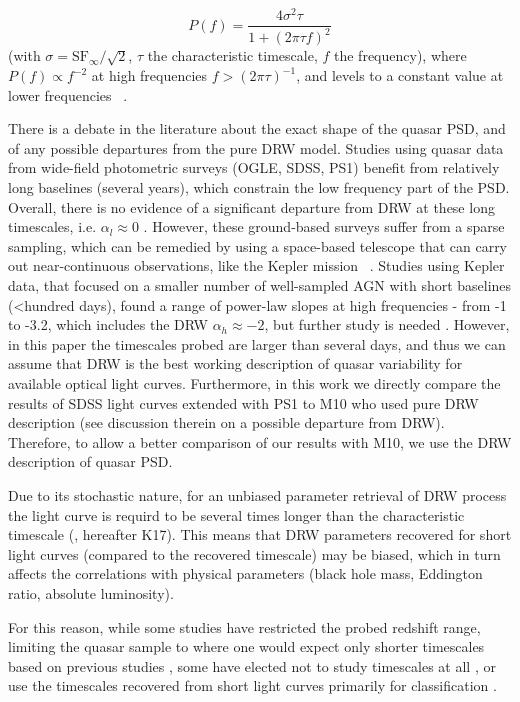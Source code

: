 \documentclass[twocolumn]{aastex62}
\begin{document}
\begin{equation}
P(f) = \frac{4\sigma^{2}\tau}{1+(2 \pi \tau f)^{2}}
\end{equation}
(with $\sigma = \mathrm{SF}_{\infty} / \sqrt{2}$, $\tau$ the characteristic timescale, $f$ the frequency), where $P(f) \propto f^{-2}$  at high frequencies $f > (2\pi \tau)^{-1}$, and levels to a constant value at lower frequencies ~\citep{kelly2014}. 

There is a debate in the literature about the exact shape of the quasar PSD, and of any possible  departures from the pure DRW model. Studies using quasar data from wide-field photometric surveys (OGLE, SDSS, PS1) benefit from relatively long baselines (several years), which constrain the low frequency part of the PSD. Overall, there is no evidence of a significant departure from DRW at these long timescales, i.e. $\alpha_{l} \approx 0$ \citep{zu2013, simm2016, kozlowski2016b, caplar2017, guo2017, sun2018}. However, these ground-based surveys suffer from a sparse sampling, which can be remedied by using a space-based telescope that can carry out near-continuous observations, like the Kepler mission ~\citep{borucki2010}. Studies using Kepler data, that focused on a smaller number of well-sampled AGN with short baselines (<hundred days), found a range of power-law slopes at high frequencies - from -1 to -3.2, which includes the DRW $\alpha_{h} \approx -2$, but further study is needed \citep{mushotzky2011,edelson2014,aranzana2018,smith2018}. However, in this paper the timescales probed are larger than several days, and thus we can assume that DRW is the best working description of quasar variability for available optical light curves. Furthermore, in this work we directly compare the results of SDSS light curves extended with PS1 to M10 who used pure DRW description (see discussion therein on a possible departure from DRW). Therefore, to allow a better comparison of our results with M10, we  use the DRW description of quasar PSD. 

Due to its stochastic nature, for an unbiased parameter retrieval of DRW process the light curve is requird to be several times longer than the characteristic timescale (\citealt{kozlowski2010, kozlowski2017a}, hereafter K17). This means that DRW parameters recovered for short light curves (compared to the recovered timescale) may be biased, which in turn affects the correlations with physical parameters (black hole mass, Eddington ratio, absolute luminosity). 

For this reason, while some studies have restricted the probed redshift range, limiting the quasar sample to where one would expect only shorter timescales based on previous studies \citep{sun2018, guo2017, kelly2013,simm2016}, some have elected not to study timescales at all \citep{sun2018,sanchez2018}, or use the timescales recovered from short light curves primarily for classification \citep{hernitschek2016}.
\end{document}
